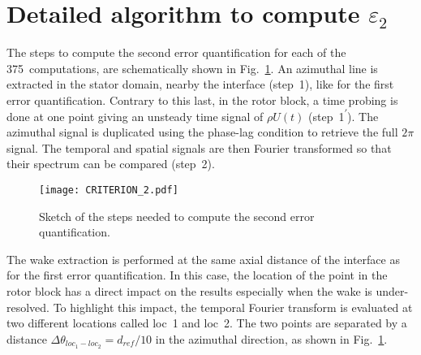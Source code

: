 \section{Detailed algorithm to compute \texorpdfstring{$\varepsilon_2$}{e2}}
\label{app:epsilon_2_steps}

The steps to compute
the second error quantification for each 
of the 375~computations, 
are schematically shown
in Fig.~\ref{fig:CRITERION_2}. An azimuthal line is extracted
in the stator domain,
nearby the interface (step~\textcircled{\small{1}}), like
for the first error quantification. 
Contrary to this last, in the rotor
block, a time probing is done at one point 
giving an unsteady time
signal of $\rho U(t)$ (step~\textcircled{\small{1}}\textsuperscript{$\prime$}). 
The azimuthal signal is
duplicated using the phase-lag condition 
to retrieve the full $2 \pi$ signal. 
The temporal and spatial signals are then
Fourier transformed so that their spectrum can be compared (step~\textcircled{\small{2}}).
\begin{figure}[htp]
  \centering
  \texttt{[image: CRITERION\_2.pdf]}
  \caption{Sketch of the steps needed to compute 
  the second error quantification.}
  \label{fig:CRITERION_2}
\end{figure}
The wake extraction is performed at the same axial 
distance of the interface as 
for the first error quantification.
In this case, the location 
of the point in the rotor block has a direct impact on 
the results especially when the wake is under-resolved.
To highlight this impact, the temporal Fourier transform is 
evaluated at two different locations called loc~1 and 
loc~2. The two points are separated 
by a distance $\Delta \theta_{loc_1-loc_2} = d_{ref} / 10$ in the azimuthal direction, 
as shown in Fig.~\ref{fig:CRITERION_2}.

